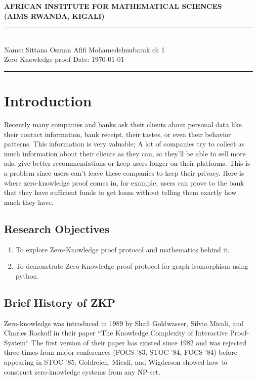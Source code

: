 \documentclass[12pt,a4paper]{article}
\begin{document}


\thispagestyle{empty}
\begin{center}
\textbf{AFRICAN INSTITUTE FOR MATHEMATICAL SCIENCES \\[0.5cm]
(AIMS RWANDA, KIGALI)}
\vspace{1.0cm}
\end{center}

\noindent
\rule{17cm}{0.2cm}\\[0.3cm]
Name: Sittana Osman Afifi Mohamedelmubarak \hfill  ch 1\\[0.1cm]
Zero Knowledge proof  \hfill Date: \today\\
\rule{17cm}{0.05cm}
\vspace{1.0cm}
\section{Introduction}
Recently many companies and banks ask their clients about personal data like their contact information, bank receipt, their tastes, or even their behavior patterns.
This information is very valuable; A lot of companies try to collect as much information about their clients as they can, so they’ll be able to sell more ads, give better recommendations or keep users longer on their platforms. This is a problem since users can’t leave these companies to keep their privacy.
Here is where zero-knowledge proof comes in, for example, users can prove to the bank that they have sufficient funds to get loans without telling them exactly how much they have.
\subsection{Research Objectives}
\begin{enumerate}	
	\item
	\begin{enumerate}
To explore Zero-Knowledge proof protocol and mathematics behind it.
\end{enumerate}	
\item
\begin{enumerate}
To demonstrate Zero-Knowledge proof protocol for graph isomorphism using python.
\end{enumerate}	
\end{enumerate}	
\subsection{Brief History of ZKP}
Zero-knowledge was introduced in 1989 by Shafi Goldwasser, Silvio Micali, and Charles Rackoff in their paper ``The Knowledge Complexity of Interactive Proof-System``\cite{goldwasser1989knowledge:1} The first version of their paper has existed since 1982 and was rejected three times from major conferences (FOCS ’83, STOC ’84, FOCS ’84) before appearing in STOC ’85. Goldreich, Micali, and Wigderson showed how to construct zero-knowledge systems from any NP-set.
\end{document}
